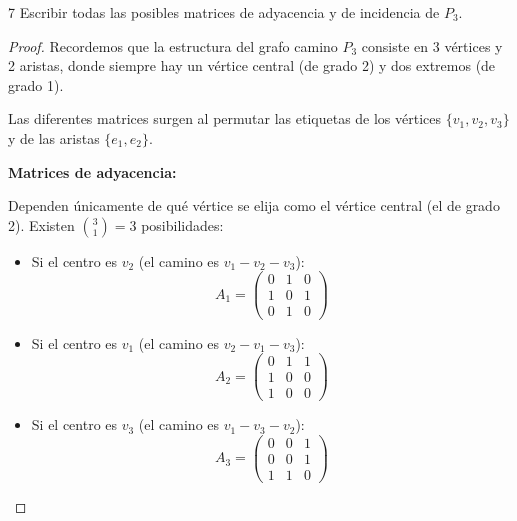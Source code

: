 \begin{ejercicio}{7}
    Escribir todas las posibles matrices de adyacencia y de incidencia de \( P_3 \).
\end{ejercicio}
\begin{proof}
    Recordemos que la estructura del grafo camino \( P_3 \) consiste en 3 vértices y 2 aristas, donde siempre hay un vértice central (de grado 2) y dos extremos (de grado 1).
    \vspace{0.5cm}
    \begin{center}
    \end{center}
    \vspace{0.5cm}
    Las diferentes matrices surgen al permutar las etiquetas de los vértices \( \{v_1, v_2, v_3\} \) y de las aristas \( \{e_1, e_2\} \).

    \textbf{Matrices de adyacencia:} \par
    Dependen únicamente de qué vértice se elija como el vértice central (el de grado 2). Existen \(\binom{3}{1} = 3\) posibilidades:
    \begin{itemize}
        \item Si el centro es \( v_2 \) (el camino es \( v_1 - v_2 - v_3 \)):
              \[ A_1 = \begin{pmatrix} 0 & 1 & 0 \\ 1 & 0 & 1 \\ 0 & 1 & 0 \end{pmatrix} \]
        \item Si el centro es \( v_1 \) (el camino es \( v_2 - v_1 - v_3 \)):
              \[ A_2 = \begin{pmatrix} 0 & 1 & 1 \\ 1 & 0 & 0 \\ 1 & 0 & 0 \end{pmatrix} \]
        \item Si el centro es \( v_3 \) (el camino es \( v_1 - v_3 - v_2 \)):
              \[ A_3 = \begin{pmatrix} 0 & 0 & 1 \\ 0 & 0 & 1 \\ 1 & 1 & 0 \end{pmatrix} \]
    \end{itemize}


\end{proof}
